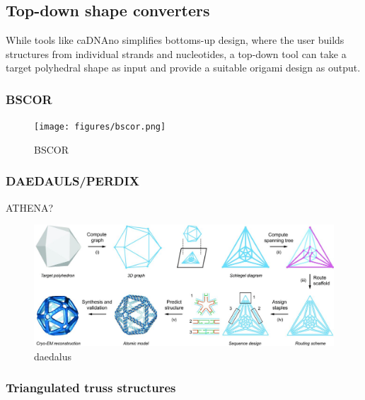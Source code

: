 \subsection{Top-down shape converters}
While tools like caDNAno simplifies bottoms-up design, where the user builds structures from individual strands and nucleotides, a top-down tool can take a target polyhedral shape as input and provide a suitable origami design as output. 


\subsubsection{BSCOR}\label{sec:bscor}

\begin{figure}[h]
  \begin{center}
    \texttt{[image: figures/bscor.png]}
    \caption{BSCOR}
    \label{fig:bscor}
  \end{center}
\end{figure}


\subsubsection{DAEDAULS/PERDIX}
ATHENA? %

\begin{figure}[h]
  \begin{center}
    \includegraphics[width=\textwidth]{figures/daedalus.jpeg}
    \caption{daedalus}
    \label{fig:daedalus}
  \end{center}
\end{figure}

\subsubsection{Triangulated truss structures}

